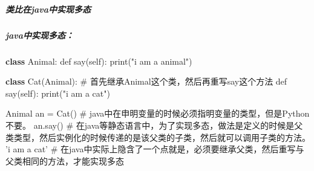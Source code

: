 \documentclass[11pt]{article}
\newenvironment{Shaded}{}{}
\newcommand{\KeywordTok}[1]{\textcolor[rgb]{0.00,0.44,0.13}{\textbf{{#1}}}}
\newcommand{\StringTok}[1]{\textcolor[rgb]{0.25,0.44,0.63}{{#1}}}
\newcommand{\FunctionTok}[1]{\textcolor[rgb]{0.02,0.16,0.49}{{#1}}}
\newcommand{\NormalTok}[1]{{#1}}
\begin{document}
    \hypertarget{ux7c7bux6bd4ux5728javaux4e2dux5b9eux73b0ux591aux6001}{%
\subparagraph{类比在java中实现多态}\label{ux7c7bux6bd4ux5728javaux4e2dux5b9eux73b0ux591aux6001}}

\hypertarget{javaux4e2dux5b9eux73b0ux591aux6001}{%
\subparagraph{java中实现多态：}\label{javaux4e2dux5b9eux73b0ux591aux6001}}

\begin{Shaded}
\begin{Highlighting}[]
\KeywordTok{class}\NormalTok{ Animal:}
\NormalTok{    def }\FunctionTok{say}\NormalTok{(self):}
        \FunctionTok{print}\NormalTok{(}\StringTok{"i am a animal"}\NormalTok{)}

\KeywordTok{class} \FunctionTok{Cat}\NormalTok{(Animal): # 首先继承Animal这个类，然后再重写say这个方法}
\NormalTok{    def }\FunctionTok{say}\NormalTok{(self):}
        \FunctionTok{print}\NormalTok{(}\StringTok{"i am a cat"}\NormalTok{)}

\NormalTok{Animal an = }\FunctionTok{Cat}\NormalTok{()           # java中在申明变量的时候必须指明变量的类型，但是Python不要。}
\NormalTok{an.}\FunctionTok{say}\NormalTok{()                    # 在java等静态语言中，为了实现多态，做法是定义的时候是父类类型，然后实例化的时候传递的是该父类的子类，然后就可以调用子类的方法。}
\NormalTok{'i am a cat'                # 在java中实际上隐含了一个点就是，必须要继承父类，然后重写与父类相同的方法，才能实现多态}
\end{Highlighting}
\end{Shaded}
\end{document}

